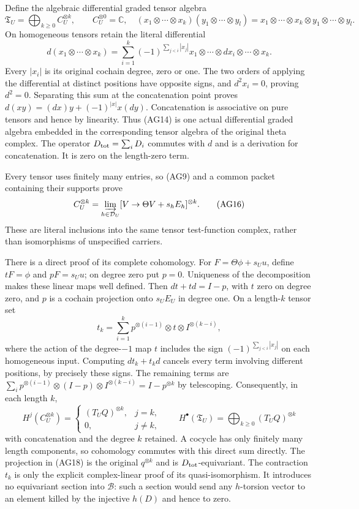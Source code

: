 Define the algebraic differential graded tensor algebra
\[
 \mathfrak T_U=\bigoplus_{k\ge0}C_U^{\otimes k},\qquad
 C_U^{\otimes0}=\mathbb C,
 \quad(x_1\otimes\cdots\otimes x_k)
       (y_1\otimes\cdots\otimes y_l)
       =x_1\otimes\cdots\otimes x_k\otimes
        y_1\otimes\cdots\otimes y_l.
 \tag{AG14}
\]
On homogeneous tensors retain the literal differential
\[
 d(x_1\otimes\cdots\otimes x_k)
 =\sum_{i=1}^k(-1)^{\sum_{j<i}|x_j|}
 x_1\otimes\cdots\otimes dx_i\otimes\cdots\otimes x_k.
 \tag{AG15}
\]
Every $|x_i|$ is its original cochain degree, zero or one.
The two orders of applying the differential at distinct positions
have opposite signs, and $d^2x_i=0$, proving $d^2=0$.
Separating this sum at the concatenation point proves
$d(xy)=(dx)y+(-1)^{|x|}x(dy)$.  Concatenation is associative
on pure tensors and hence by linearity.  Thus (AG14) is one actual
differential graded algebra embedded in the corresponding tensor
algebra of the original theta complex.  The operator
$D_{\rm tot}=\sum_iD_i$ commutes with $d$ and is a derivation
for concatenation.  It is zero on the length-zero term.

Every tensor uses finitely many entries, so (AG9) and a common
packet containing their supports prove
\[
 C_U^{\otimes k}
 =\varinjlim_{h\in\mathcal D_U}
 [V\to\Theta V+s_hE_h]^{\otimes k}.
 \tag{AG16}
\]
These are literal inclusions into the same tensor test-function
complex, rather than isomorphisms of unspecified carriers.

There is a direct proof of its complete cohomology.  For
$F=\Theta\phi+s_Uu$, define $tF=\phi$ and $pF=s_Uu$;
on degree zero put $p=0$.  Uniqueness of the decomposition makes
these linear maps well defined.  Then $dt+td=I-p$, with $t$
zero on degree zero, and $p$ is a cochain projection onto $s_UE_U$
in degree one.  On a length-$k$ tensor set
\[
 t_k=\sum_{i=1}^k p^{\otimes(i-1)}\otimes t\otimes
                  I^{\otimes(k-i)},
 \tag{AG17}
\]
where the action of the degree-$-1$ map $t$ includes the sign
$(-1)^{\sum_{j<i}|x_j|}$ on each homogeneous input.
Computing $dt_k+t_kd$ cancels every term involving different
positions, by precisely these signs.  The remaining terms are
$\sum_i p^{\otimes(i-1)}\otimes(I-p)\otimes
I^{\otimes(k-i)}=I-p^{\otimes k}$ by telescoping.
Consequently, in each length $k$,
\[
 H^j(C_U^{\otimes k})=
 \begin{cases}(T_UQ)^{\otimes k},&j=k,\\0,&j\ne k,
 \end{cases}
 \qquad
 H^\bullet(\mathfrak T_U)=
 \bigoplus_{k\ge0}(T_UQ)^{\otimes k}
 \tag{AG18}
\]
with concatenation and the degree $k$ retained.  A cocycle has
only finitely many length components, so cohomology commutes with
this direct sum directly.  The projection in (AG18) is the original
$q^{\otimes k}$ and is $D_{\rm tot}$-equivariant.  The contraction
$t_k$ is only the explicit complex-linear proof of its
quasi-isomorphism.  It introduces no equivariant section into
$\mathscr B$: such a section would send any $h$-torsion vector
to an element killed by the injective $h(D)$ and hence to zero.

